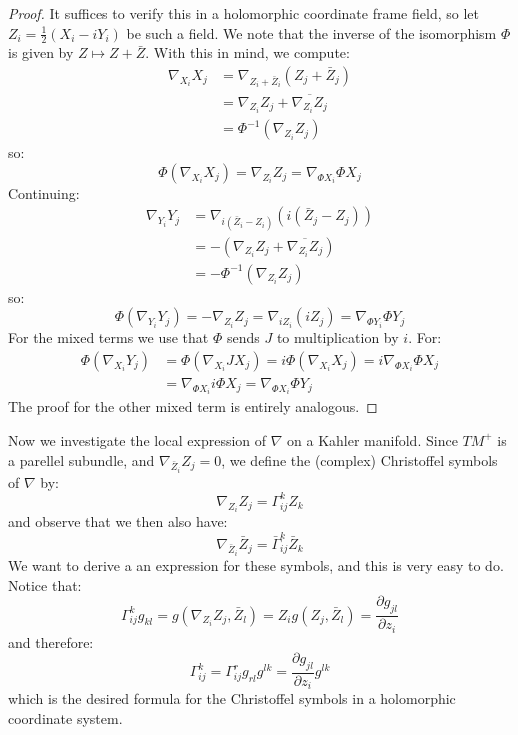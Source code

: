 \documentclass[11pt]{amsart}
\theoremstyle{definition}
\def \del{ \partial }
\begin{document}
\begin{proof}
%
It suffices to verify this in a holomorphic coordinate frame field, so let $Z_i = \frac{1}{2}(X_i - i Y_i)$ be such a field.  We note that the inverse of the isomorphism $\Phi$ is given by $Z \mapsto Z + \bar{Z}$.  With this in mind, we compute:
%
\begin{align*}
\nabla_{X_i} X_j & = \nabla_{Z_i + \bar{Z}_i} ( Z_j + \bar{Z}_j ) \\
&= \nabla_{Z_i} Z_j + \overline{ \nabla_{Z_i} Z_j }\\
&= \Phi^{-1}( \nabla_{Z_i} Z_j )
\end{align*}
%
so:
%
$$ \Phi ( \nabla_{X_i} X_j ) = \nabla_{Z_i} Z_j = \nabla_{ \Phi X_i } \Phi X_j $$
%
Continuing:
%
\begin{align*}
\nabla_{Y_i} Y_j &= \nabla_{i(\bar{Z}_i - Z_i)} ( i(\bar{Z}_j - Z_j ) ) \\
&= - (\nabla_{Z_i} Z_j + \overline{ \nabla_{Z_i} Z_j } ) \\
&= - \Phi^{-1}( \nabla_{Z_i} Z_j ) 
\end{align*}
%
so:
%
$$ \Phi( \nabla_{Y_i} Y_j ) = -  \nabla_{Z_i} Z_j =  \nabla_{i Z_i}( i Z_j ) = \nabla_{ \Phi Y_i } \Phi Y_j $$
%
For the mixed terms we use that $\Phi$ sends $J$ to multiplication by $i$.  For:
%
\begin{align*}
\Phi( \nabla_{X_i} Y_j ) &= \Phi( \nabla_{X_i} J X_j ) = i \Phi( \nabla_{X_i} X_j ) = i \nabla_{\Phi X_i} \Phi X_j \\
&= \nabla_{\Phi X_i } i \Phi X_j = \nabla_{\Phi X_i} \Phi Y_j 
\end{align*}
%
The proof for the other mixed term is entirely analogous. 
%
\end{proof}


Now we investigate the local expression of $\nabla$ on a Kahler manifold.  Since $TM^{+}$ is a parellel subundle, and $\nabla_{\bar{Z}_i} Z_j = 0$, we define the (complex) Christoffel symbols of $\nabla$ by:
%
$$ \nabla_{Z_i} Z_j = \Gamma_{ij}^k Z_k $$
%
and observe that we then also have:
%
$$ \nabla_{ \bar{Z}_i } \bar{Z}_j = \bar{\Gamma}_{ij}^k \bar{Z}_k $$
%
We want to derive a an expression for these symbols, and this is very easy to do.  Notice that:
%
$$ \Gamma_{ij}^k g_{kl} = g( \nabla_{Z_i} Z_j, \bar{Z}_l ) = Z_i g( Z_j, \bar{Z}_l ) = \frac{ \del g_{jl} }{ \del z_i } $$
%
and therefore:
%
$$ \Gamma_{ij}^k = \Gamma_{ij}^r g_{rl} g^{lk} = \frac{ \del g_{jl} }{ \del z_i } g^{lk} $$
%
which is the desired formula for the Christoffel symbols in a holomorphic coordinate system.
\end{document}
